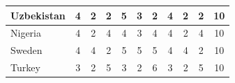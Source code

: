 \documentclass[12pt]{article}  %
\begin{document}
\begin{subappendices}
\begin{longtable}{|l|c|c|c|c|c|c|c|c|c|c|}
	\hline
	Uzbekistan                                                     & 4                                                                      & 2                                                                      & 2                                                                      & 5                                                                      & 3                                                                      & 2                                                                      & 4                         & 2                           & 2                           & 10                          \\ 
	\hline
	Nigeria                                                        & 4                                                                      & 2                                                                      & 4                                                                      & 4                                                                      & 3                                                                      & 4                                                                      & 4                         & 2                           & 4                           & 10                          \\ 
	\hline
	Sweden                                                         & 4                                                                      & 4                                                                      & 2                                                                      & 5                                                                      & 5                                                                      & 5                                                                      & 4                         & 4                           & 2                           & 10                          \\ 
	\hline
	Turkey                                                         & 3                                                                      & 2                                                                      & 5                                                                      & 3                                                                      & 2                                                                      & 6                                                                      & 3                         & 2                           & 5                           & 10                          \\ 

\end{longtable}
\end{subappendices}
\end{document}
